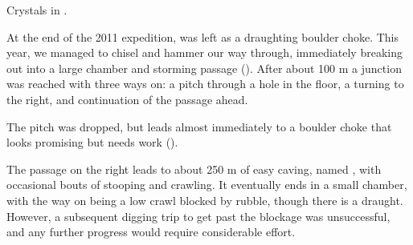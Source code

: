 \begin{marginfigure}
\checkoddpage \ifoddpage \forcerectofloat \else \forceversofloat \fi
\centering
 \caption{Crystals in . }
 \label{bnw crystals}
\end{marginfigure}

At the end of the 2011 expedition,  was left as a
draughting boulder choke. This year, we managed to chisel and hammer our
way through, immediately breaking out into a large chamber and storming
passage (). After about 100 m a junction was reached with
three ways on: a pitch through a hole in the floor, a turning to the right, and continuation of the passage ahead.

The pitch was dropped, but leads almost immediately to a boulder choke
that looks promising but needs work ().

The passage on the right leads to about 250 m of easy caving, named ,
with occasional bouts of stooping and crawling. It eventually ends in a
small chamber, with the way on being a low crawl blocked by rubble,
though there is a draught. However, a subsequent digging trip to get
past the blockage was unsuccessful, and any further progress would
require considerable effort.

